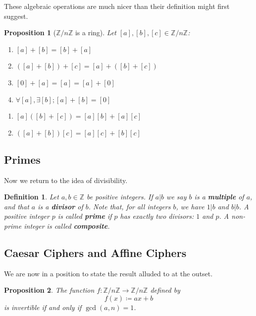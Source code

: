 \documentclass{article}
\newcommand{\blue}[1]{ {\color{blue}{#1}} }
\newcommand{\Z}{\mathbb{Z}}
\theoremstyle{plain}
\newtheorem{definition}{Definition}
\newtheorem{proposition}{Proposition}
\begin{document}
These algebraic operations are much nicer than their definition might first suggest.

\begin{proposition}[$\Z/n\Z$ is a ring]
    Let $[a],[b],[c] \in \Z/n\Z$:
    \begin{enumerate}
        \item $[a]+[b] = [b]+[a]$
        \item $([a]+[b]) + [c] = [a] + ([b]+[c])$
        \item $[0]+[a] = [a] = [a]+[0]$
        \item $\forall [a], \exists [b]; [a]+[b] = [0]$
    \end{enumerate}

    \begin{enumerate}
        \item $[a]([b]+[c]) = [a][b] + [a][c]$
        \item $([a]+[b])[c] = [a][c] + [b][c]$
    \end{enumerate}
\end{proposition}

\blue{
\begin{proof}
    To do.
\end{proof}
}




\subsection{Primes}

Now we return to the idea of divisibility.
\begin{definition}
    Let $a,b \in \Z$ be positive integers.
    If $a|b$ we say $b$ is a \textbf{multiple} of $a$, and that 
    $a$ is a \textbf{divisor} of $b$.
    Note that, for all integers $b$, we have $1|b$ and $b|b$.
    A positive integer $p$ is called \textbf{prime} if $p$ has exactly 
    two divisors: $1$ and $p$.
    A non-prime integer is called \textbf{composite}.
\end{definition}


















\subsection{Caesar Ciphers and Affine Ciphers}

We are now in a position to state the result alluded to at the outset.

\begin{proposition}
    The function $f: \Z/n\Z \to \Z/n\Z$ defined by 
    \[
        f(x) \coloneq ax + b
    \]
    is invertible if and only if $\gcd(a,n)=1$.
\end{proposition}

\blue{
\begin{proof}
    Todo.
\end{proof}
}
\end{document}
